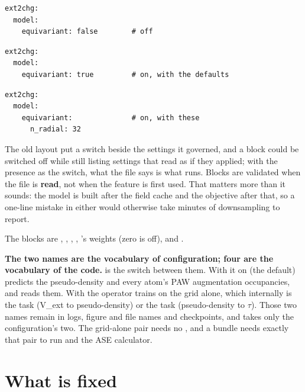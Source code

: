 \begin{lstlisting}
ext2chg:
  model:
    equivariant: false        # off
\end{lstlisting}

\begin{lstlisting}
ext2chg:
  model:
    equivariant: true         # on, with the defaults
\end{lstlisting}

\begin{lstlisting}
ext2chg:
  model:
    equivariant:              # on, with these
      n_radial: 32
\end{lstlisting}

The old layout put a switch beside the settings it governed, and a block could be switched off while still listing settings that read as if they applied; with the presence as the switch, what the file says is what runs. Blocks are validated when the file is \textbf{read}, not when the feature is first used. That matters more than it sounds: the model is built after the field cache and the objective after that, so a one-line mistake in either would otherwise take minutes of downsampling to report.

The blocks are , , , , 's weights (zero is off),  and .

\textbf{The two names are the vocabulary of configuration; four are the vocabulary of the code.}  is the switch between them. With it on (the default)  predicts the pseudo-density and every atom's PAW augmentation occupancies, and  reads them. With  the operator trains on the grid alone, which internally is the  task (V\_ext to pseudo-density) or the  task (pseudo-density to $\tau$). Those two names remain in logs, figure and file names and checkpoints, and  takes only the configuration's two. The grid-alone pair needs no , and a bundle needs exactly that pair to run  and the ASE calculator.

\section{What is fixed}

